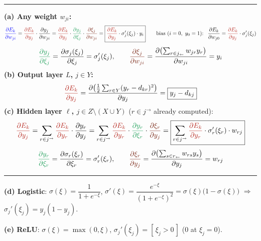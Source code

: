 \documentclass[10pt]{article}
\newcommand{\pd}[2]{\frac{\partial #1}{\partial #2}}
\newcommand{\into}{_{\leftarrow}}
\newcommand{\out}{^{\rightarrow}}
\newcommand{\Ey}[1]{\textcolor{BrickRed}{\pd{E_k}{y_{#1}}}}
\newcommand{\hsec}[1]{\par\vspace{4pt}{\large\bfseries #1}\par\vspace{1pt}\hrule\vspace{3pt}}
\begin{document}
\hsec{3\quad Derivation, layer by layer}
\textbf{(a) Any weight $w_{ji}$:}
\[
\textcolor{blue}{\pd{E_k}{w_{ji}}}
=\Ey{j}\cdot\pd{y_j}{w_{ji}}
=\Ey{j}\cdot\textcolor{ForestGreen}{\pd{y_j}{\xi_j}}\cdot\textcolor{Brown}{\pd{\xi_j}{w_{ji}}}
=\boxed{\Ey{j}\cdot\sigma_j'(\xi_j)\cdot y_i}
\qquad\text{bias } (i=0,\ y_0=1)\text{: }\
\pd{E_k}{w_{j0}}=\Ey{j}\cdot\sigma_j'(\xi_j)
\]
\[
\textcolor{ForestGreen}{\pd{y_j}{\xi_j}}=\pd{\sigma_j(\xi_j)}{\xi_j}=\sigma_j'(\xi_j),
\qquad
\textcolor{Brown}{\pd{\xi_j}{w_{ji}}}=\pd{\bigl(\sum_{r\in j\into}w_{jr}y_r\bigr)}{w_{ji}}=y_i
\]
\textbf{(b) Output layer $L$, $j\in Y$:}
\[
\Ey{j}=\pd{\bigl(\frac12\sum_{r\in Y}(y_r-d_{kr})^2\bigr)}{y_j}=\boxed{y_j-d_{kj}}
\]
\textbf{(c) Hidden layer $\ell$, $j\in Z\setminus(X\cup Y)$} ($r\in j\out$ already computed):
\[
\Ey{j}=\sum_{r\in j\out}\Ey{r}\cdot\pd{y_r}{y_j}
=\sum_{r\in j\out}\Ey{r}\cdot\textcolor{ForestGreen}{\pd{y_r}{\xi_r}}\cdot\textcolor{Brown}{\pd{\xi_r}{y_j}}
=\boxed{\sum_{r\in j\out}\Ey{r}\cdot\sigma_r'(\xi_r)\cdot w_{rj}}
\]
\[
\textcolor{ForestGreen}{\pd{y_r}{\xi_r}}=\pd{\sigma_r(\xi_r)}{\xi_r}=\sigma_r'(\xi_r),
\qquad
\textcolor{Brown}{\pd{\xi_r}{y_j}}=\pd{\bigl(\sum_{s\in r\into}w_{rs}y_s\bigr)}{y_j}=w_{rj}
\]

\hsec{4\quad Activations}
\textbf{(d) Logistic}:\;
$\sigma(\xi)=\dfrac{1}{1+e^{-\xi}}$,\quad
$\sigma'(\xi)=\dfrac{e^{-\xi}}{(1+e^{-\xi})^2}=\sigma(\xi)\bigl(1-\sigma(\xi)\bigr)$
\;$\Rightarrow$\; $\boxed{\sigma_j'(\xi_j)=y_j(1-y_j)}$.

\textbf{(e) ReLU}:\;
$\sigma(\xi)=\max(0,\xi)$,\quad
$\boxed{\sigma_j'(\xi_j)=[\,\xi_j>0\,]}$ \;($0$ at $\xi_j=0$).
\end{document}
